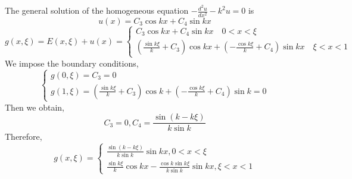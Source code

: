 \documentclass{article}
\begin{document}
\subsection{}
The general solution of the homogeneous equation $- \frac { d ^ { 2 } u } { d x ^ { 2 } } - k ^ { 2 } u = 0$ is $$u ( x ) =  C _ { 3 }  \cos k x +  C _ { 4 } 
     \sin k x$$
     $$
     g ( x , \xi ) = E ( x , \xi ) + u ( x ) = \left\{ \begin{array} { l } {  C _ { 3 }  \cos k x + C _ { 4 }  \sin k x } \quad { 0 < x < \xi } \\ { \left( \frac { \sin k \xi } { k } +  C _ { 3 }  \right) \cos k x + \left( - \frac { \cos k \xi } { k } +C _ { 4 } \right) \sin k x }  \quad{ \xi < x < 1 } \end{array} \right.
     $$
     We impose the boundary conditions,
     $$
     \left\{ \begin{array}  { l } g(0, \xi ) =  C _ { 3 }  = 0 
     \\ g ( 1 , \xi ) = { \left( \frac { \sin k \xi } { k } +  C _ { 3 }  \right) \cos k + \left( - \frac { \cos k \xi } { k } +C _ { 4 } \right) \sin k }=0 \end{array} \right.
     $$
     Then we obtain,$$
      C _ { 3 }= 0 , C _ { 4 } = \frac { \sin ( k - k \xi ) } { k \sin k }
     $$
     Therefore, $$
     g ( x , \xi ) = \left\{ \begin{array} { l } { \frac { \sin ( k - k \xi ) } { k \sin k } \sin k x }, { 0 < x < \xi } \\ { \frac { \sin k \xi } { k } \cos k x - \frac { \cos k  \sin k \xi } { k \sin k } \sin k x } ,{ \xi < x < 1 } \end{array} \right.$$
\end{document}
